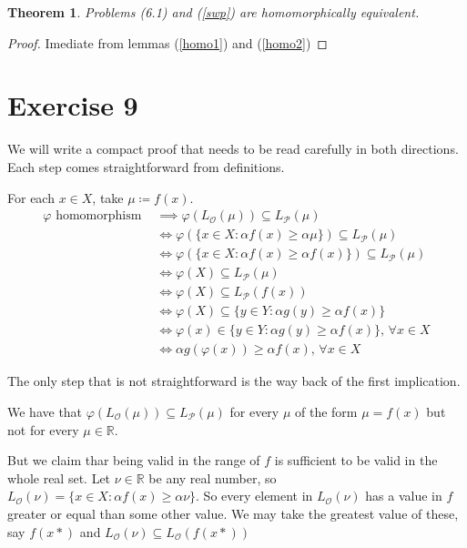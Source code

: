 \documentclass[a4paper,10pt, leqno]{article}
\let\oldref\ref
\renewcommand{\ref}[1]{(\oldref{#1})}
\begin{document}
\newtheorem{theorem}{Theorem}
\begin{theorem}
    Problems (6.1) and \ref{swp} are homomorphically equivalent. 
\end{theorem}
\begin{proof}
    Imediate from lemmas \ref{homo1} and \ref{homo2}
\end{proof}

\section*{Exercise 9}

We will write a compact proof that needs to be read carefully in both directions. Each step comes straightforward from definitions.

For each $x \in X$, take $\mu \coloneqq f(x)$.
\begin{align*}
\varphi \text{ homomorphism } &\implies \varphi(L_\mathcal{O}(\mu)) \subseteq L_\mathcal{P}(\mu)\\
& \iff \varphi(\{x \in X : \alpha f(x) \geq \alpha \mu \}) \subseteq L_\mathcal{P}(\mu) \\
& \iff \varphi(\{x \in X : \alpha f(x) \geq \alpha f(x) \}) \subseteq L_\mathcal{P}(\mu) \\
& \iff \varphi(X) \subseteq L_\mathcal{P}(\mu) \\
& \iff \varphi(X) \subseteq L_\mathcal{P}(f(x)) \\
& \iff \varphi(X) \subseteq \{ y \in Y : \alpha g(y) \geq \alpha f(x)\}\\
& \iff \varphi(x) \in \{ y \in Y : \alpha g(y) \geq \alpha f(x)\} \text{, } \forall x \in X \\
& \iff \alpha g(\varphi(x)) \geq \alpha f(x) \text{, } \forall x \in X 
\end{align*}

The only step that is not straightforward is the way back of the first implication.

We have that 
$\varphi(L_\mathcal{O}(\mu)) \subseteq L_\mathcal{P}(\mu)$
for every $\mu$ of the form $\mu = f(x)$ but not for every $\mu \in \mathbb{R}$.

But we claim thar being valid in the range of $f$ is sufficient to be valid in the whole real set. 
Let $\nu \in \mathbb{R}$ be any real number, so $L_\mathcal{O}(\nu) = \{x \in X : \alpha f(x) \geq \alpha \nu \}$. So every element in $L_\mathcal{O}(\nu)$ has a value in $f$ greater or equal than some other value. We may take the greatest value of these, say $f(x*)$ and $L_\mathcal{O}(\nu) \subseteq L_\mathcal{O}(f(x*))$
\end{document}
